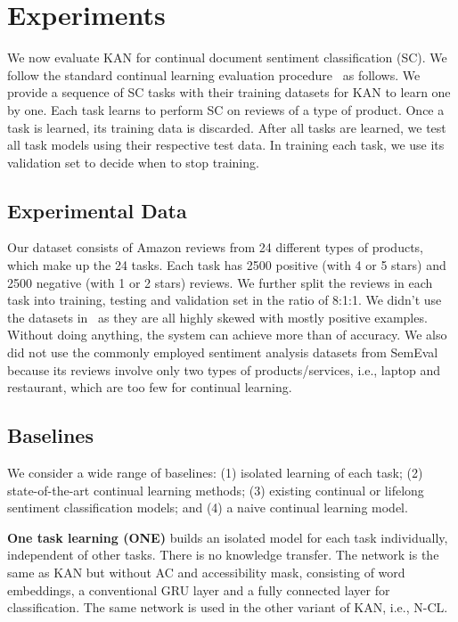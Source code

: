 \documentclass[runningheads]{llncs}
\begin{document}
\section{Experiments}
\label{sec:experiments}


We now evaluate KAN for continual document sentiment classification (SC). We follow the standard continual learning evaluation procedure~\cite{DBLP:journals/corr/abs-1909-08383} as follows. 
We provide a sequence of SC tasks with their training datasets for KAN to learn one by one. Each task learns to perform SC on reviews of a type of product. Once a task is learned, its training data is discarded. After all tasks are learned, we test all task models using their respective test data. In training each task, we use its validation set to decide when to stop training.   



\subsection{Experimental Data}


Our dataset consists of Amazon reviews from 24 different types of products, which make up the 24 tasks. Each task has 2500 positive (with 4 or 5 stars) and 2500 negative (with 1 or 2 stars) reviews. We further split the reviews in each task into training, testing and validation set in the ratio of 8:1:1. We didn't use the datasets in~\cite{DBLP:conf/dasfaa/LvWLCZ19} as they are all highly skewed with mostly positive examples. Without doing anything, the system can achieve more than  of accuracy. We also did not use the commonly employed sentiment analysis datasets from SemEval~\cite{pontiki2016semeval} because its reviews involve only two types of products/services, i.e., laptop and restaurant, which are too few for continual learning. 

\subsection{Baselines}
\label{sec:baselines}
We consider a wide range of baselines: (1) isolated learning of each task; (2) state-of-the-art continual learning methods; (3) existing continual or lifelong sentiment classification models; and (4) a naive continual learning model.

\textbf{One task learning (ONE)} builds an isolated model for each task individually, independent of other tasks. There is no knowledge transfer. The network is the same as KAN but without AC and accessibility mask, consisting of word embeddings, a conventional GRU layer and a fully connected layer for classification. The same network is used in the other variant of KAN, i.e., N-CL. 
\end{document}
